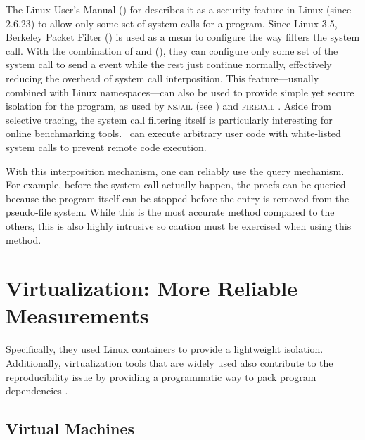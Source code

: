 The Linux User's Manual (\citeyear{manpages}) for  describes it as a security feature in Linux (since 2.6.23) to allow only some set of system calls for a program.
Since Linux 3.5, Berkeley Packet Filter () is used as a mean to configure the way  filters the system call.
With the combination of  and  (), they can configure only some set of the system call to send a  event while the rest just continue normally, effectively reducing the overhead of system call interposition.
This feature---usually combined with Linux namespaces---can also be used to provide simple yet secure isolation for the program, as used by \textsc{nsjail} (see ) and \textsc{firejail} \citep{netblue30LinuxNamespacesSeccompbpf2019}.
Aside from selective tracing, the system call filtering itself is particularly interesting for online benchmarking tools.
\First~can execute arbitrary user code with white-listed system calls to prevent remote code execution.

With this interposition mechanism, one can reliably use the query mechanism.
For example, before the  system call actually happen, the procfs can be queried because the program itself can be stopped before the entry is removed from the pseudo-file system.
While this is the most accurate method compared to the others, this is also highly intrusive so caution must be exercised when using this method.

\section{Virtualization: More Reliable Measurements}
\label{sec:resource.virtualization}

Specifically, they used Linux containers to provide a lightweight isolation.
Additionally, virtualization tools that are widely used also contribute to the reproducibility issue by providing a programmatic way to pack program dependencies \citep{boettigerIntroductionDockerReproducible2015,kordonBenchKitToolMassive2014}.

\subsection{Virtual Machines}

